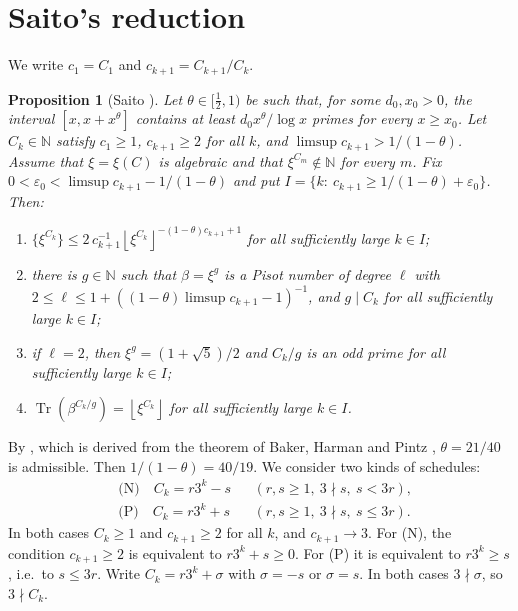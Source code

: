 \documentclass[11pt,a4paper]{article}
\newtheorem{proposition}[theorem]{Proposition}
\theoremstyle{definition}
\theoremstyle{remark}
\newcommand{\N}{\mathbb{N}}
\DeclareMathOperator{\Tr}{Tr}
\newcommand{\floor}[1]{\left\lfloor #1\right\rfloor}
\begin{document}
\section{Saito's reduction}\label{sec:saito}

We write $c_1=C_1$ and $c_{k+1}=C_{k+1}/C_k$.

\begin{proposition}[Saito {\cite[Proposition~3.2]{SaiVar}}]\label{prop:saito}
Let $\theta\in[\frac12,1)$ be such that, for some $d_0,x_0>0$, the interval $[x,x+x^\theta]$ contains at least $d_0x^\theta/\log x$ primes for every $x\ge x_0$.
Let $C_k\in\N$ satisfy $c_1\ge1$, $c_{k+1}\ge2$ for all $k$, and $\limsup c_{k+1}>1/(1-\theta)$.
Assume that $\xi=\xi(C)$ is algebraic and that $\xi^{C_m}\notin\N$ for every $m$.
Fix $0<\varepsilon_0<\limsup c_{k+1}-1/(1-\theta)$ and put $I=\{k:\ c_{k+1}\ge1/(1-\theta)+\varepsilon_0\}$.
Then:
\begin{enumerate}[label=\textup{(\roman*)}]
\item $\{\xi^{C_k}\}\le 2\,c_{k+1}^{-1}\floor{\xi^{C_k}}^{-(1-\theta)c_{k+1}+1}$ for all sufficiently large $k\in I$;
\item there is $g\in\N$ such that $\beta=\xi^g$ is a Pisot number of degree $\ell$ with $2\le\ell\le1+((1-\theta)\limsup c_{k+1}-1)^{-1}$, and $g\mid C_k$ for all sufficiently large $k\in I$;
\item if $\ell=2$, then $\xi^g=(1+\sqrt5)/2$ and $C_k/g$ is an odd prime for all sufficiently large $k\in I$;
\item $\Tr(\beta^{C_k/g})=\floor{\xi^{C_k}}$ for all sufficiently large $k\in I$.
\end{enumerate}
\end{proposition}
By \cite[Theorem~3.1]{SaiVar}, which is derived from the theorem of Baker, Harman and Pintz \cite{BHP01}, $\theta=21/40$ is admissible. Then $1/(1-\theta)=40/19$.
We consider two kinds of schedules:
\begin{equation}\label{eq:schedules}
\begin{aligned}
 &\text{(N)}\quad C_k=r3^k-s &&(r,s\ge1,\ 3\nmid s,\ s<3r),\\
 &\text{(P)}\quad C_k=r3^k+s &&(r,s\ge1,\ 3\nmid s,\ s\le3r).
\end{aligned}
\end{equation}
In both cases $C_k\ge1$ and $c_{k+1}\ge2$ for all $k$, and $c_{k+1}\to3$.
For (N), the condition $c_{k+1}\ge2$ is equivalent to $r3^k+s\ge0$. For (P) it is equivalent to $r3^k\ge s$, i.e.\ to $s\le3r$.
Write $C_k=r3^k+\sigma$ with $\sigma=-s$ or $\sigma=s$. In both cases $3\nmid\sigma$, so $3\nmid C_k$.
\end{document}
